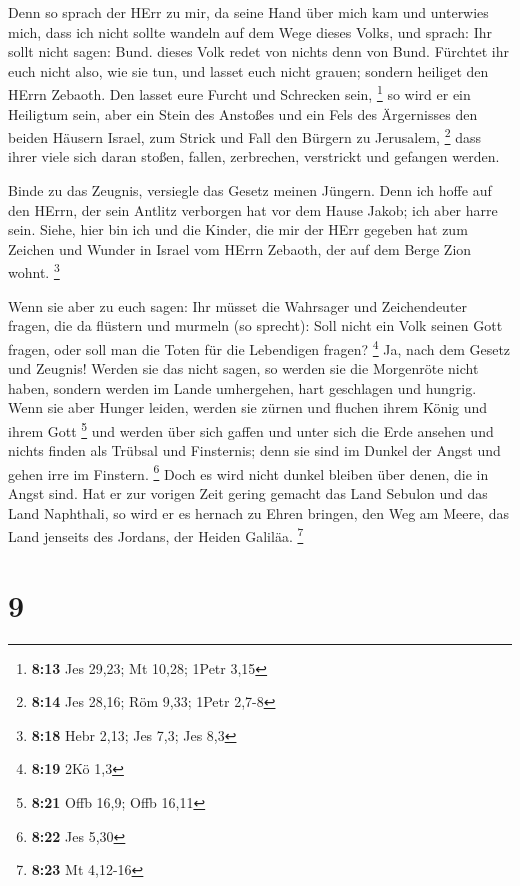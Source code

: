  Denn so sprach der HErr zu mir, da seine Hand über mich
kam und unterwies mich, dass ich nicht sollte wandeln auf dem Wege
dieses Volks, und sprach:  Ihr sollt nicht sagen: Bund.
dieses Volk redet von nichts denn von Bund. Fürchtet ihr euch nicht
also, wie sie tun, und lasset euch nicht grauen;  sondern
heiliget den HErrn Zebaoth. Den lasset eure Furcht und Schrecken sein,
\footnote{\textbf{8:13} Jes 29,23; Mt 10,28; 1Petr 3,15} 
so wird er ein Heiligtum sein, aber ein Stein des Anstoßes und ein Fels
des Ärgernisses den beiden Häusern Israel, zum Strick und Fall den
Bürgern zu Jerusalem, \footnote{\textbf{8:14} Jes 28,16; Röm 9,33; 1Petr
  2,7-8}  dass ihrer viele sich daran stoßen, fallen,
zerbrechen, verstrickt und gefangen werden.

 Binde zu das Zeugnis, versiegle das Gesetz meinen Jüngern.
 Denn ich hoffe auf den HErrn, der sein Antlitz verborgen
hat vor dem Hause Jakob; ich aber harre sein.  Siehe, hier
bin ich und die Kinder, die mir der HErr gegeben hat zum Zeichen und
Wunder in Israel vom HErrn Zebaoth, der auf dem Berge Zion wohnt.
\footnote{\textbf{8:18} Hebr 2,13; Jes 7,3; Jes 8,3}

 Wenn sie aber zu euch sagen: Ihr müsset die Wahrsager und
Zeichendeuter fragen, die da flüstern und murmeln (so sprecht): Soll
nicht ein Volk seinen Gott fragen, oder soll man die Toten für die
Lebendigen fragen? \footnote{\textbf{8:19} 2Kö 1,3}  Ja,
nach dem Gesetz und Zeugnis! Werden sie das nicht sagen, so werden sie
die Morgenröte nicht haben,  sondern werden im Lande
umhergehen, hart geschlagen und hungrig. Wenn sie aber Hunger leiden,
werden sie zürnen und fluchen ihrem König und ihrem Gott \footnote{\textbf{8:21}
  Offb 16,9; Offb 16,11}  und werden über sich gaffen und
unter sich die Erde ansehen und nichts finden als Trübsal und
Finsternis; denn sie sind im Dunkel der Angst und gehen irre im
Finstern. \footnote{\textbf{8:22} Jes 5,30}  Doch es wird
nicht dunkel bleiben über denen, die in Angst sind. Hat er zur vorigen
Zeit gering gemacht das Land Sebulon und das Land Naphthali, so wird er
es hernach zu Ehren bringen, den Weg am Meere, das Land jenseits des
Jordans, der Heiden Galiläa. \footnote{\textbf{8:23} Mt 4,12-16}

\hypertarget{section-4}{%
\section{9}\label{section-4}}


